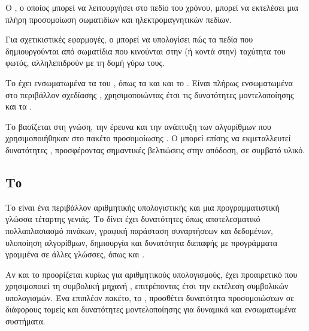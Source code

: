 Ο , ο οποίος μπορεί να λειτουργήσει στο πεδίο του χρόνου, μπορεί να εκτελέσει μια πλήρη προσομοίωση σωματιδίων και ηλεκτρομαγνητικών πεδίων.

Για σχετικιστικές εφαρμογές, ο  μπορεί να υπολογίσει πώς τα πεδία που δημιουργούνται από σωματίδια που κινούνται στην (ή κοντά στην) ταχύτητα του φωτός, αλληλεπιδρούν με τη δομή γύρω τους.

Το  έχει ενσωματωμένα τα  του , όπως τα  και  και το .
Είναι πλήρως ενσωματωμένα στο περιβάλλον σχεδίασης , χρησιμοποιώντας έτσι τις δυνατότητες μοντελοποίησης και τα .

Το  βασίζεται στη γνώση, την έρευνα και την ανάπτυξη των αλγορίθμων που χρησιμοποιήθηκαν στο πακέτο προσομοίωσης . 
Ο  μπορεί επίσης να εκμεταλλευτεί δυνατότητες , προσφέροντας σημαντικές βελτιώσεις στην απόδοση, σε συμβατό υλικό.

\subsection{Το }
Το  είναι ένα περιβάλλον αριθμητικής υπολογιστικής και μια προγραμματιστική γλώσσα τέταρτης γενιάς. 
Το  δίνει έχει δυνατότητες όπως αποτελεσματικό πολλαπλασιασμό πινάκων, γραφική παράσταση συναρτήσεων και δεδομένων, υλοποίηση αλγορίθμων, δημιουργία  και δυνατότητα διεπαφής με προγράμματα γραμμένα σε άλλες γλώσσες, όπως
 και .

Αν και το  προορίζεται κυρίως για αριθμητικούς υπολογισμούς, έχει προαιρετικό  που χρησιμοποιεί τη συμβολική μηχανή , επιτρέποντας έτσι την εκτέλεση συμβολικών υπολογισμών.
Ένα επιπλέον πακέτο, το , προσθέτει δυνατότητα προσομοιώσεων σε διάφορους τομείς και δυνατότητες μοντελοποίησης για δυναμικά και ενσωματωμένα συστήματα.

